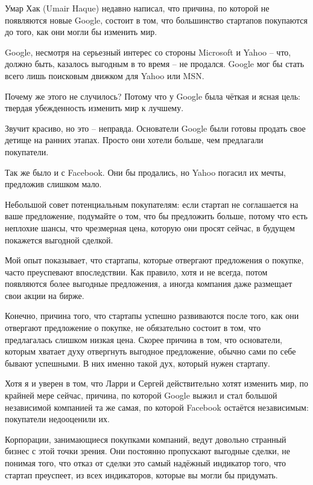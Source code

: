 \documentclass[ebook,12pt,oneside,openany]{memoir}
\begin{document}
\maketitle

Умар Хак (Umair Haque) недавно написал, что причина, по которой не
появляются новые Google, состоит в том, что большинство стартапов
покупаются до того, как они могли бы изменить мир.

Google, несмотря на серьезный интерес со стороны Microsoft и Yahoo --
что, должно быть, казалось выгодным в то время -- не продался. Google
мог бы стать всего лишь поисковым движком для Yahoo или MSN.

Почему же этого не случилось? Потому что у Google была чёткая и ясная
цель: твердая убежденность изменить мир к лучшему.

Звучит красиво, но это -- неправда. Основатели Google были готовы
продать свое детище на ранних этапах. Просто они хотели больше, чем
предлагали покупатели.

Так же было и с Facebook. Они бы продались, но Yahoo погасил их мечты,
предложив слишком мало.

Небольшой совет потенциальным покупателям: если стартап не соглашается
на ваше предложение, подумайте о том, что бы предложить больше, потому
что есть неплохие шансы, что чрезмерная цена, которую они просят
сейчас, в будущем покажется выгодной сделкой.

Мой опыт показывает, что стартапы, которые отвергают предложения о
покупке, часто преуспевают впоследствии. Как правило, хотя и не
всегда, потом появляются более выгодные предложения, а иногда компания
даже размещает свои акции на бирже.

Конечно, причина того, что стартапы успешно развиваются после того,
как они отвергают предложение о покупке, не обязательно состоит в том,
что предлагалась слишком низкая цена. Скорее причина в том, что
основатели, которым хватает духу отвергнуть выгодное предложение,
обычно сами по себе бывают успешными. В них именно такой дух, который
нужен стартапу.

Хотя я и уверен в том, что Ларри и Сергей действительно хотят изменить
мир, по крайней мере сейчас, причина, по которой Google выжил и стал
большой независимой компанией та же самая, по которой Facebook
остаётся независимым: покупатели недооценили их.

Корпорации, занимающиеся покупками компаний, ведут довольно странный
бизнес с этой точки зрения. Они постоянно пропускают выгодные сделки,
не понимая того, что отказ от сделки это самый надёжный индикатор
того, что стартап преуспеет, из всех индикаторов, которые вы могли бы
придумать.
\end{document}
